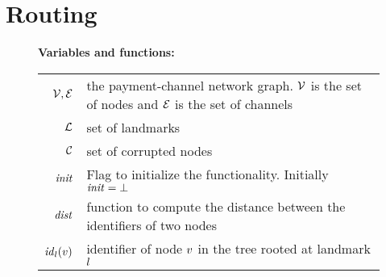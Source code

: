 \section{Routing}
\label{sec:routing}

\begin{figure*}[htb]
	\begin{center}	
		\textbf{Variables and functions:}
		
		\begin{tabular}{r l}
			$\mathcal{V},\mathcal{E}$ & the payment-channel network graph. $\mathcal{V}$ is the set of nodes and $\mathcal{E}$ is the set of channels\\
			$\mathcal{L}$ & set of landmarks\\
			$\mathcal{C}$ & set of corrupted nodes\\
			$\mathit{init}$ & Flag to initialize the functionality. Initially $\mathit{init} = \bot$\\
			$\mathit{dist}$ & function to compute the distance between the identifiers of two nodes\\
			$\mathit{id}_{l}(v)$ & identifier of node $v$ in the tree rooted at landmark $l$ 
		\end{tabular}
\end{center}
\end{figure*}
